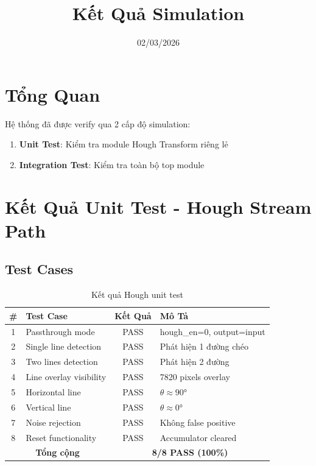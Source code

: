 \documentclass[12pt,a4paper]{article}
\title{Kết Quả Simulation}
\author{}
\date{02/03/2026}
\begin{document}
\maketitle

\section{Tổng Quan}

Hệ thống đã được verify qua 2 cấp độ simulation:
\begin{enumerate}
    \item \textbf{Unit Test}: Kiểm tra module Hough Transform riêng lẻ
    \item \textbf{Integration Test}: Kiểm tra toàn bộ top module
\end{enumerate}

\section{Kết Quả Unit Test - Hough Stream Path}

\subsection{Test Cases}
\begin{table}[h]
\centering
\begin{tabular}{|c|l|c|l|}
\hline
\textbf{\#} & \textbf{Test Case} & \textbf{Kết Quả} & \textbf{Mô Tả} \\
\hline
1 & Passthrough mode & \cellcolor{passgreen!30}\textcolor{passgreen}{PASS} & hough\_en=0, output=input \\
2 & Single line detection & \cellcolor{passgreen!30}\textcolor{passgreen}{PASS} & Phát hiện 1 đường chéo \\
3 & Two lines detection & \cellcolor{passgreen!30}\textcolor{passgreen}{PASS} & Phát hiện 2 đường \\
4 & Line overlay visibility & \cellcolor{passgreen!30}\textcolor{passgreen}{PASS} & 7820 pixels overlay \\
5 & Horizontal line & \cellcolor{passgreen!30}\textcolor{passgreen}{PASS} & $\theta \approx 90°$ \\
6 & Vertical line & \cellcolor{passgreen!30}\textcolor{passgreen}{PASS} & $\theta \approx 0°$ \\
7 & Noise rejection & \cellcolor{passgreen!30}\textcolor{passgreen}{PASS} & Không false positive \\
8 & Reset functionality & \cellcolor{passgreen!30}\textcolor{passgreen}{PASS} & Accumulator cleared \\
\hline
\multicolumn{2}{|c|}{\textbf{Tổng cộng}} & \multicolumn{2}{c|}{\textbf{8/8 PASS (100\%)}} \\
\hline
\end{tabular}
\caption{Kết quả Hough unit test}
\end{table}
\end{document}
